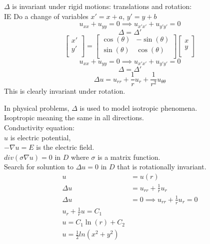 \documentclass[answers, 12pts,addpoints]{exam}
\begin{document}
\begin{definition}[Invariance]
    $\Delta$ is invariant under rigid motions: translations and rotation:\\
    IE 
    Do a change of variables $x' = x + a$, $y' = y + b$\\
    $$u_{xx} + u_{yy} = 0 \implies u_{x'x'} + u_{y'y'} = 0$$
    $$ \Delta = \Delta' $$
    $$\begin{bmatrix}
        x'\\
        y'\\
    \end{bmatrix} = \begin{bmatrix}
        \cos(\theta) & -\sin(\theta)\\
        \sin(\theta) & \cos(\theta)\\
    \end{bmatrix} \begin{bmatrix}
        x\\
        y\\
    \end{bmatrix}$$
    $$u_{xx} + u_{yy} = 0 \implies u_{x'x'} + u_{y'y'} = 0$$
    $$ \Delta = \Delta' $$
    $$\Delta u = u_{rr} + \frac{1}{r} u_r + \frac{1}{r^2} u_{\theta\theta}$$
    This is clearly invariant under rotation.\\
\end{definition}
In physical problems, $\Delta$ is used to model isotropic phenomena.\\
Isoptropic meaning the same in all directions.\\
Conductivity equation: \\
$u$ is electric potential, \\
$-\nabla u = E$ is the electric field.\\
$div(\sigma \nabla u ) = 0$ in $D$ where $\sigma$ is a matrix function.\\
Search for soluntion to $\Delta u = 0$ in $D$ that is rotationally invariant.\\
\begin{align*}
    u &= u(r)\\
    \Delta u &= u_{rr} + \frac{1}{r} u_r\\
    \Delta u &= 0 \implies u_{rr} + \frac{1}{r} u_r = 0\\
    u_r + \frac{1}{r} u = C_1\\
    u = C_1 \ln(r) + C_2\\
    u = \frac{1}{2} ln(x^2 + y^2) \\
\end{align*} 
\end{document}

